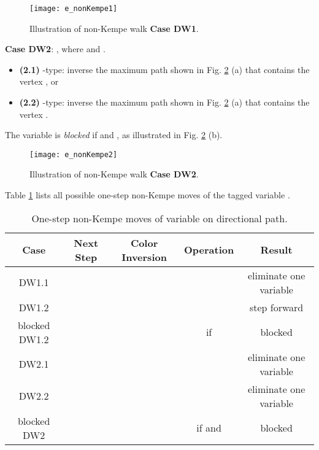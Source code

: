 \documentclass[11pt]{article}
\begin{document}
\begin{figure}[htpb]
	\centering
	\texttt{[image: e\_nonKempe1]}
	\caption{Illustration of non-Kempe walk {\bf Case DW1}.}
	\label{fig:nonKempe1}
\end{figure}

{\bf Case DW2}:  , where  and .
\begin{itemize}  
\itemsep -2pt 
\item {\bf (2.1)} -type: inverse the maximum  path  shown in Fig. \ref{fig:nonKempe2} (a) that contains the vertex , or
\item {\bf (2.2)} -type: inverse the maximum  path  shown in Fig. \ref{fig:nonKempe2} (a) that contains the vertex .
\end{itemize}

The variable   is {\it blocked} if   and , as illustrated in Fig. \ref{fig:nonKempe2} (b). 



\begin{figure}[htpb]
	\centering
	\texttt{[image: e\_nonKempe2]}
	\caption{Illustration of non-Kempe walk {\bf Case DW2}.}
	\label{fig:nonKempe2}
\end{figure}

Table \ref{tab:nonKempeWalkcase} lists all possible one-step non-Kempe moves of the tagged variable .

\begin{table}[!t]
	\centering
	{\footnotesize
		\begin{tabular}{|c|c| c| c|c| }
			\hline 
			Case & Next Step & Color Inversion& Operation & Result \\
			\hline \hline
			DW1.1 &  &  & &eliminate one variable\\ \hline	
			DW1.2 &  &  & & step forward \\ \hline 
			blocked DW1.2    &                                        &                                              & if   & blocked \\ \hline 
			DW2.1 &   &  & & eliminate one variable \\ \hline 
			DW2.2 &  &  && eliminate one variable \\ \hline	
		 blocked DW2    &                                       &                                              & if   and  & blocked \\ \hline	
		\end{tabular}
		}
	\caption{One-step non-Kempe moves of  variable on directional path.}
	\label{tab:nonKempeWalkcase}
\end{table}
\end{document}
